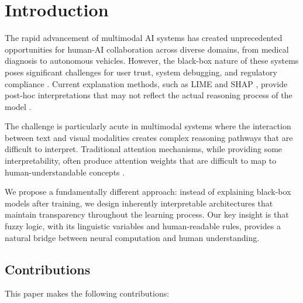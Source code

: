 \documentclass[manuscript,review,anonymous]{acmart}
\begin{document}
\section{Introduction}

The rapid advancement of multimodal AI systems has created unprecedented opportunities for human-AI collaboration across diverse domains, from medical diagnosis to autonomous vehicles. However, the black-box nature of these systems poses significant challenges for user trust, system debugging, and regulatory compliance \cite{lipton2018mythos}. Current explanation methods, such as LIME \cite{ribeiro2016should} and SHAP \cite{lundberg2017unified}, provide post-hoc interpretations that may not reflect the actual reasoning process of the model \cite{rudin2019stop}.

The challenge is particularly acute in multimodal systems where the interaction between text and visual modalities creates complex reasoning pathways that are difficult to interpret. Traditional attention mechanisms, while providing some interpretability, often produce attention weights that are difficult to map to human-understandable concepts \cite{jain2019attention}.

We propose a fundamentally different approach: instead of explaining black-box models after training, we design inherently interpretable architectures that maintain transparency throughout the learning process. Our key insight is that fuzzy logic, with its linguistic variables and human-readable rules, provides a natural bridge between neural computation and human understanding.

\subsection{Contributions}

This paper makes the following contributions:
\end{document}
